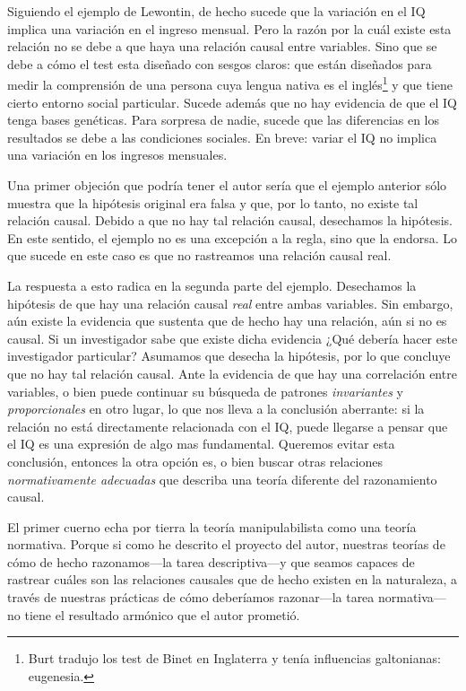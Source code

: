 Siguiendo el ejemplo de Lewontin, de hecho sucede que la
variación en el IQ implica una variación en el ingreso
mensual. Pero la razón por la cuál existe esta relación no
se debe a que haya una relación causal entre variables. Sino
que se debe a cómo el test esta diseñado con sesgos claros:
que están diseñados para medir la comprensión de una persona
cuya lengua nativa es el inglés\footnote{ 
  Burt tradujo los test de Binet en Inglaterra y tenía
  influencias galtonianas: eugenesia.
} 
y que tiene cierto entorno social particular. Sucede además
que no hay evidencia de que el IQ tenga bases genéticas.
Para sorpresa de nadie, sucede que las diferencias en los 
resultados se debe a las condiciones sociales. En
breve: variar el IQ no implica una variación en los ingresos
mensuales. 

Una primer objeción que podría tener el autor sería que el
ejemplo anterior sólo muestra que la hipótesis original era
falsa y que, por lo tanto, no existe tal relación causal.
Debido a que no hay tal relación causal, desechamos la
hipótesis. En este sentido,  el ejemplo no es una excepción
a la regla, sino que la endorsa. Lo que sucede en este caso
es que no rastreamos una relación causal real.

La respuesta a esto radica en la segunda parte del ejemplo.
Desechamos la hipótesis de que hay una relación causal
\emph{real} entre ambas variables. Sin embargo, aún existe
la evidencia que sustenta que de hecho hay una relación, aún
si no es causal. Si un investigador sabe que existe dicha
evidencia ¿Qué debería hacer este investigador particular?
Asumamos que desecha la hipótesis, por lo que concluye que
no hay tal relación causal. Ante la evidencia de que hay una
correlación entre variables, o bien puede continuar su
búsqueda de patrones \emph{invariantes} y
\emph{proporcionales} en otro lugar, lo que nos lleva a la
conclusión aberrante: si la relación no está directamente
relacionada con el IQ, puede llegarse a pensar que el IQ es
una expresión de algo mas fundamental. Queremos evitar esta
conclusión, entonces la otra opción es, o bien buscar
otras relaciones \emph{normativamente adecuadas} que describa una teoría diferente del
razonamiento causal.


El primer cuerno echa por tierra la teoría manipulabilista
como una teoría normativa. Porque si como he descrito el
proyecto del autor, nuestras teorías de cómo de hecho
razonamos---la tarea descriptiva---y que seamos capaces de
rastrear cuáles son las relaciones causales que de hecho
existen en la naturaleza, a través de nuestras prácticas de
cómo deberíamos razonar---la tarea normativa---no tiene el
resultado armónico que el autor prometió.   

